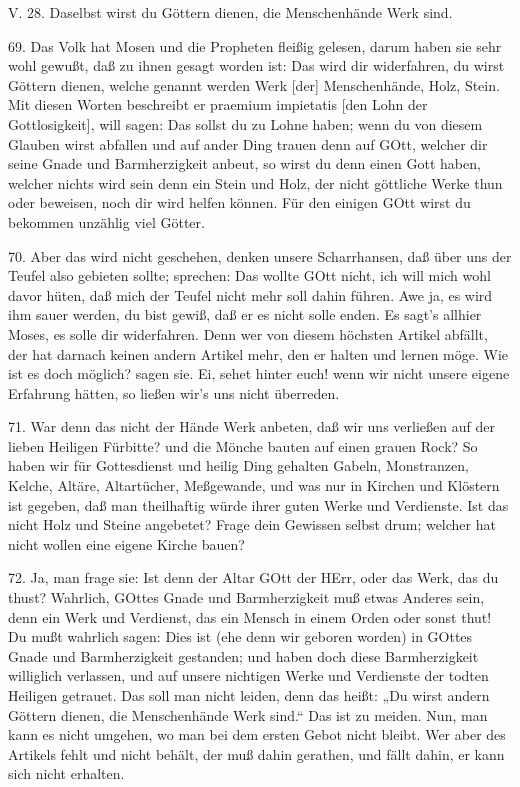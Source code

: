 \begin{schriftzitat}
V. 28. Daselbst wirst du Göttern dienen, die Menschenhände Werk sind.
\end{schriftzitat}

69. Das Volk hat Mosen und die Propheten fleißig gelesen, darum haben sie sehr wohl gewußt, daß zu ihnen gesagt worden ist: Das wird dir widerfahren, du wirst Göttern dienen, welche genannt werden Werk [der] Menschenhände, Holz, Stein. Mit diesen Worten beschreibt er praemium impietatis [den Lohn der Gottlosigkeit], will sagen: Das sollst du zu Lohne haben; wenn du von diesem Glauben wirst abfallen und auf ander Ding trauen denn auf GOtt, welcher dir seine Gnade und Barmherzigkeit anbeut, so wirst du denn einen Gott haben, welcher nichts wird sein denn ein Stein und Holz, der nicht göttliche Werke thun oder beweisen, noch dir wird helfen können. Für den einigen GOtt wirst du bekommen unzählig viel Götter.

70. Aber das wird nicht geschehen, denken unsere Scharrhansen, daß über uns der Teufel also gebieten sollte; sprechen: Das wollte GOtt nicht, ich will mich wohl davor hüten, daß mich der Teufel nicht mehr soll dahin führen. Awe ja, es wird ihm sauer werden, du bist gewiß, daß er es nicht solle enden. Es sagt’s allhier Moses, es solle dir widerfahren. Denn wer von diesem höchsten Artikel abfällt, der hat darnach keinen andern Artikel mehr, den er halten und lernen möge. Wie ist es doch möglich? sagen sie. Ei, sehet hinter euch! wenn wir nicht unsere eigene Erfahrung hätten, so ließen wir’s uns nicht überreden.

71. War denn das nicht der Hände Werk anbeten, daß wir uns verließen auf der lieben Heiligen Fürbitte? und die Mönche bauten auf einen grauen Rock? So haben wir für Gottesdienst und heilig Ding gehalten Gabeln, Monstranzen, Kelche, Altäre, Altartücher, Meßgewande, und was nur in Kirchen und Klöstern ist gegeben, daß man theilhaftig würde ihrer guten Werke und Verdienste. Ist das nicht Holz und Steine angebetet? Frage dein Gewissen selbst drum; welcher hat nicht wollen eine eigene Kirche bauen?

72. Ja, man frage sie: Ist denn der Altar GOtt der HErr, oder das Werk, das du thust? Wahrlich, GOttes Gnade und Barmherzigkeit muß etwas Anderes sein, denn ein Werk und Verdienst, das ein Mensch in einem Orden oder sonst thut! Du mußt wahrlich sagen: Dies ist (ehe denn wir geboren worden) in GOttes Gnade und Barmherzigkeit gestanden; und haben doch diese Barmherzigkeit williglich verlassen, und auf unsere nichtigen Werke und Verdienste der todten Heiligen getrauet. Das soll man nicht leiden, denn das heißt: „Du wirst andern Göttern dienen, die Menschenhände Werk sind.“ Das ist zu meiden. Nun, man kann es nicht umgehen, wo man bei dem ersten Gebot nicht bleibt. Wer aber des Artikels fehlt und nicht behält, der muß dahin gerathen, und fällt dahin, er kann sich nicht erhalten.

